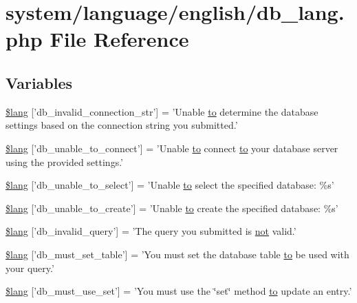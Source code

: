 \hypertarget{db__lang_8php}{\section{system/language/english/db\-\_\-lang.php File Reference}
\label{db__lang_8php}
}
\subsection*{Variables}
\begin{DoxyCompactItemize}
\item 
\hyperlink{db__lang_8php_a0c2ed2613101d37cbaba14042530c16d}{\$lang} \mbox{[}'db\-\_\-invalid\-\_\-connection\-\_\-str'\mbox{]} = 'Unable \hyperlink{mathquill_8js_ae3622f38202b3532cd6eae25726945f8}{to} determine the database settings based on the connection string you submitted.'
\item 
\hyperlink{db__lang_8php_aa5935b86c957eb15ac7d41cf84143d66}{\$lang} \mbox{[}'db\-\_\-unable\-\_\-to\-\_\-connect'\mbox{]} = 'Unable \hyperlink{mathquill_8js_ae3622f38202b3532cd6eae25726945f8}{to} connect \hyperlink{mathquill_8js_ae3622f38202b3532cd6eae25726945f8}{to} your database server using the provided settings.'
\item 
\hyperlink{db__lang_8php_a3c93974df838c0e036690874108715ea}{\$lang} \mbox{[}'db\-\_\-unable\-\_\-to\-\_\-select'\mbox{]} = 'Unable \hyperlink{mathquill_8js_ae3622f38202b3532cd6eae25726945f8}{to} select the specified database\-: \%s'
\item 
\hyperlink{db__lang_8php_a4266e3b235feb16d9cf2e88afd1fedac}{\$lang} \mbox{[}'db\-\_\-unable\-\_\-to\-\_\-create'\mbox{]} = 'Unable \hyperlink{mathquill_8js_ae3622f38202b3532cd6eae25726945f8}{to} create the specified database\-: \%s'
\item 
\hyperlink{db__lang_8php_a2cbf4ee929f45a29a0dcf21280bad485}{\$lang} \mbox{[}'db\-\_\-invalid\-\_\-query'\mbox{]} = 'The query you submitted is \hyperlink{mathquill_8js_ac1e1ab538c27d68cc2cbafea74e7412c}{not} valid.'
\item 
\hyperlink{db__lang_8php_a0f5d469f071f2b5327b44761f4a06396}{\$lang} \mbox{[}'db\-\_\-must\-\_\-set\-\_\-table'\mbox{]} = 'You must set the database table \hyperlink{mathquill_8js_ae3622f38202b3532cd6eae25726945f8}{to} be used with your query.'
\item 
\hyperlink{db__lang_8php_a55e22fb14cedc8ee7f70980bf7f37308}{\$lang} \mbox{[}'db\-\_\-must\-\_\-use\-\_\-set'\mbox{]} = 'You must use the \char`\"{}set\char`\"{} method \hyperlink{mathquill_8js_ae3622f38202b3532cd6eae25726945f8}{to} update an entry.'

\end{DoxyCompactItemize}
